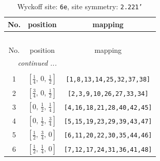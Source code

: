 \documentclass[fleqn,8pt]{jsarticle}
\begin{document}
\renewcommand{\arraystretch}{1.2}
\begin{longtable}{ccc}
\caption{Wyckoff site: {\tt 6e}, site symmetry: {\tt 2.221'}}
 \\
 \hline \hline
No. & position & mapping \\ \hline \endfirsthead

\multicolumn{2}{l}{\tablename\ \thetable{}} \\
 \hline \hline
No. & position & mapping \\ \hline \endhead

 \hline \hline
\multicolumn{2}{r}{\footnotesize\it continued ...} \\ \endfoot

 \hline \hline
\multicolumn{2}{r}{} \\ \endlastfoot

1 & $\left[ \frac{1}{4},\, 0,\, \frac{1}{2} \right]$ & {\tt [1,8,13,14,25,32,37,38]} \\ \hline
2 & $\left[ \frac{3}{4},\, 0,\, \frac{1}{2} \right]$ & {\tt [2,3,9,10,26,27,33,34]} \\ \hline
3 & $\left[ 0,\, \frac{1}{2},\, \frac{1}{4} \right]$ & {\tt [4,16,18,21,28,40,42,45]} \\ \hline
4 & $\left[ 0,\, \frac{1}{2},\, \frac{3}{4} \right]$ & {\tt [5,15,19,23,29,39,43,47]} \\ \hline
5 & $\left[ \frac{1}{2},\, \frac{3}{4},\, 0 \right]$ & {\tt [6,11,20,22,30,35,44,46]} \\ \hline
6 & $\left[ \frac{1}{2},\, \frac{1}{4},\, 0 \right]$ & {\tt [7,12,17,24,31,36,41,48]} \\
\end{longtable}
\renewcommand{\arraystretch}{1.2}
\end{document}
